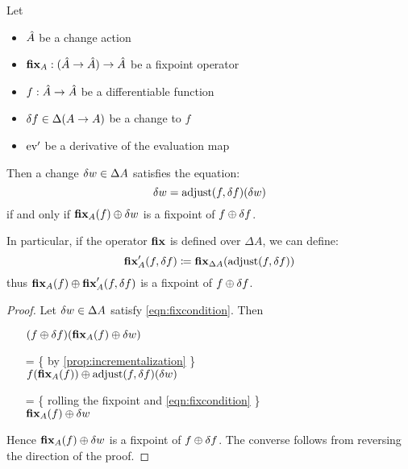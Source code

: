 \begin{thm}
\label{thm:fixpointDiff}
  Let 
  \begin{itemize}
    \item $\hat{A}$ be a change action
    \item$\textbf{fix}_A : (\hat{A} \rightarrow \hat{A}) \rightarrow \hat{A}$ be a fixpoint operator
    \item $f: \hat{A} \rightarrow \hat{A}$ be a differentiable function
    \item $\delta f \in \Delta (A \rightarrow A)$ be a change to $f$
    \item $\operatorname{ev}'$ be a derivative of the evaluation map
  \end{itemize}

  Then a change $\delta w \in \Delta A$ satisfies
  the equation:
  \begin{equation}\label{eqn:fixcondition}
    \delta w = \operatorname{adjust}(f, \delta f)(\delta w)
  \end{equation}
  if and only if $\textbf{fix}_A(f) \oplus \delta w$ is a fixpoint of $f \oplus \delta f$.
  
  In particular, if the operator $\textbf{fix}$ is defined over $\Delta A$, we can define:
  $$
  \textbf{fix}_A'(f, \delta f) \coloneqq
  \textbf{fix}_{\Delta A}(\operatorname{adjust}(f, \delta f))
  $$
  thus $\textbf{fix}_A(f) \oplus \textbf{fix}_A'(f, \delta f)$ is a fixpoint 
  of $f \oplus \delta f$.
\end{thm}
\ifproofs
\begin{proof}
  Let $\delta w \in \Delta A$ satisfy \cref{eqn:fixcondition}. Then
  \begin{itemize}
  \item[ ]
    $
    (f \oplus \delta f)(\textbf{fix}_A(f) \oplus \delta w)
    $
  \item[=]\{ by \cref{prop:incrementalization} \}\\
    $
    f(\textbf{fix}_A(f))
    \oplus
    \operatorname{adjust}(f, \delta f)(\delta w)
    $
  \item[=]\{ rolling the fixpoint and \cref{eqn:fixcondition} \}\\
    $
    \textbf{fix}_A(f)
    \oplus
    \delta w
    $
  \end{itemize}
  Hence $\textbf{fix}_A(f) \oplus \delta w$ is a fixpoint of $f \oplus \delta f$. The converse
  follows from reversing the direction of the proof.
\end{proof}
\fi

